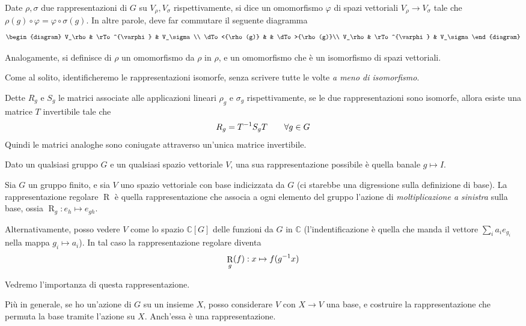\documentclass[a4paper,10pt,oneside]{math_article}
\renewcommand{\phi}{\varphi}
\newcommand{\id}{I}
\DeclareMathOperator{\Reg}{R}
\begin{document}
    
    \begin{mydef}
      Date $\rho,\sigma$ due rappresentazioni di $G$ su $V_\rho,V_\sigma$ rispettivamente, si dice  un omomorfismo $\phi$ di spazi vettoriali $V_\rho \rightarrow V_\sigma$ tale che $\rho(g) \circ \phi = \phi \circ \sigma(g)$. 
      In altre parole, deve far commutare il seguente diagramma
      \[
       \begin{diagram}
	V_\rho         & \rTo^{\phi}  & V_\sigma\\
	\dTo<{\rho(g)} &           	 & \dTo>{\rho(g)}\\
	V_\rho         & \rTo^{\phi}  & V_\sigma
       \end{diagram}
      \]
       
    Analogamente, si definisce  di $\rho$ un omomorfismo da $\rho$ in $\rho$, e  un omomorfismo che è un isomorfismo di spazi vettoriali.
    \end{mydef}
    
    Come al solito, identificheremo le rappresentazioni isomorfe, senza scrivere tutte le volte \emph{a meno di isomorfismo}.
    
    Dette $R_g$ e $S_g$ le matrici associate alle applicazioni lineari $\rho_g$ e $\sigma_g$ rispettivamente, se le due rappresentazioni sono isomorfe, allora esiste una matrice $T$ invertibile tale che
    \[
     R_g = T^{-1} S_g T \qquad \forall g\in G
    \]
    Quindi le matrici analoghe sono coniugate attraverso un'unica matrice invertibile.
        
    \begin{myexample}
     Dato un qualsiasi gruppo $G$ e un qualsiasi spazio vettoriale $V$, una sua rappresentazione possibile è quella banale $g \mapsto \id$.
    \end{myexample}
    \begin{myexample}
     Sia $G$ un gruppo finito, e sia $V$ uno spazio vettoriale con base indicizzata da $G$ (ci starebbe una digressione sulla definizione di base). La rappresentazione regolare $\Reg$ è quella rappresentazione che associa a ogni elemento del gruppo l'azione di \emph{moltiplicazione a sinistra} sulla base, ossia $\Reg_g: e_h \mapsto e_{gh}$.
     
     Alternativamente, posso vedere $V$ come lo spazio $\mathbb C[G]$ delle funzioni da $G$ in $\mathbb C$ (l'indentificazione è quella che manda il vettore $\sum_i a_ie_{g_i}$ nella mappa $g_i \mapsto a_i$). In tal caso la rappresentazione regolare diventa
     \[
     \Reg_g(f): x \mapsto  f ( g\inv x) 
     \]
     
     Vedremo l'importanza di questa rappresentazione.
     \end{myexample}
     \begin{myexample}
      Più in generale, se ho un'azione di $G$ su un insieme $X$, posso considerare $V$ con $X\rightarrow V$ una base, e costruire la rappresentazione che permuta la base tramite l'azione su $X$. Anch'essa è una rappresentazione.
    \end{myexample}
  
\end{document}
